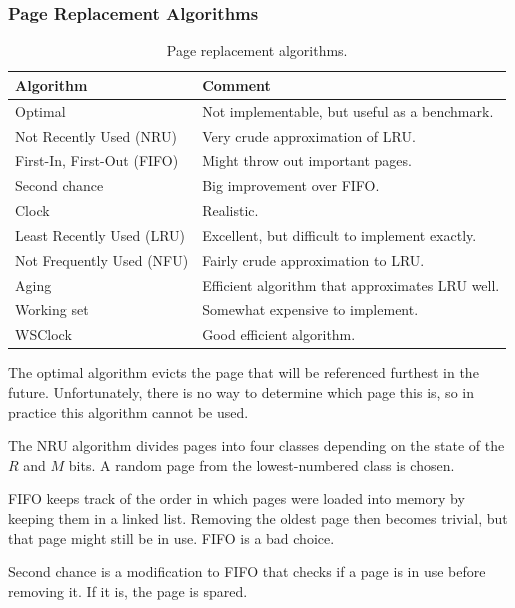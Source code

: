 \documentclass[11pt,a4paper]{article}
\begin{document}
\subsubsection{Page Replacement Algorithms}
\begin{table}[h!]
	\begin{center}
		\begin{tabular}{| l | l |}
		\hline
		\textbf{Algorithm} & \textbf{Comment} \\
		\hline
		Optimal & Not implementable, but useful as a benchmark.\\
		\hline
		Not Recently Used (NRU) & Very crude approximation of LRU. \\
		\hline
		First-In, First-Out (FIFO) & Might throw out important pages.\\
		\hline
		Second chance & Big improvement over FIFO.\\
		\hline
		Clock & Realistic.\\
		\hline
		Least Recently Used (LRU) & Excellent, but difficult to implement exactly.\\
		\hline
		Not Frequently Used (NFU) & Fairly crude approximation to LRU.\\
		\hline
		Aging & Efficient algorithm that approximates LRU well.\\
		\hline
		Working set & Somewhat expensive to implement.\\
		\hline
		WSClock & Good efficient algorithm.\\
		\hline
		\end{tabular}
	\end{center}
	\caption{Page replacement algorithms.}
\end{table}

The optimal algorithm evicts the page that will be referenced furthest in the future. Unfortunately, there is no way to determine which page this is, so in practice this algorithm cannot be used. 

The NRU algorithm divides pages into four classes depending on the state of the $R$ and $M$ bits. A random page from the lowest-numbered class is chosen. 

FIFO keeps track of the order in which pages were loaded into memory by keeping them in a linked list. Removing the oldest page then becomes trivial, but that page might still be in use. FIFO is a bad choice.

Second chance is a modification to FIFO that checks if a page is in use before removing it. If it is, the page is spared. 
\end{document}
